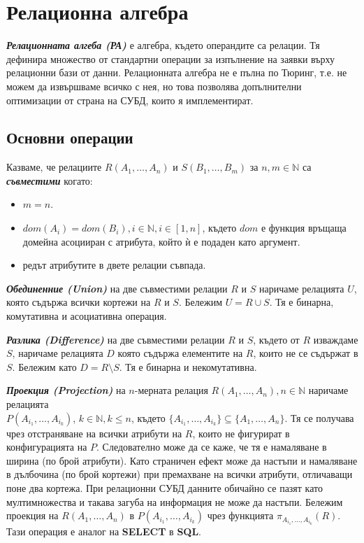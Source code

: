 \documentclass[fleqn,12pt]{article}
\begin{document}
\section{Релационна алгебра}

\textit{\textbf{Релационната алгеба (РА)}} е алгебра, където операндите са релации.
Тя дефинира множество от стандартни операции за изпълнение на заявки върху релационни бази от данни.
Релационната алгебра не е пълна по Тюринг, т.е. не можем да извършваме всичко с нея, но това позволява допълнителни оптимизации от страна на СУБД, които я имплементират.

\subsection{Основни операции}

Казваме, че релациите $R(A_1, \dots, A_n)$ и $S(B_1, \dots, B_m)$ за $n, m \in \mathbb{N}$ са \textbf{\textit{съвместими}} когато:
\begin{itemize}
    \item $m = n$.
    \item $dom(A_i) = dom(B_i), i \in \mathbb{N}, i \in [1, n]$, където $dom$ е функция връщаща домейна асоцииран с атрибута, който ѝ е подаден като аргумент.
    \item редът атрибутите в двете релации съвпада.
\end{itemize}
\bigbreak

\textbf{\textit{Обединенние (Union)}} на две съвместими релации $R$ и $S$ наричаме релацията $U$, която съдържа всички кортежи на $R$ и $S$.
Бележим $U = R \cup S$.
Тя е бинарна, комутативна и асоциативна операция.
\bigbreak

\textbf{\textit{Разлика (Difference)}} на две съвместими релации $R$ и $S$, където от $R$ изваждаме $S$, наричаме релацията $D$ която съдържа елементите на $R$, които не се съдържат в $S$.
Бележим като $D = R \setminus S$.
Тя е бинарна и некомутативна.
\bigbreak

\textbf{\textit{Проекция (Projection)}} на $n$-мерната релация $R(A_1, \dots, A_n), n \in \mathbb{N}$ наричаме релацията \\
$P(A_{i_1}, \dots, A_{i_k})$, $k \in \mathbb{N}, k \leq n$, където $\{A_{i_1}, \dots, A_{i_k}\} \subseteq \{A_1, \dots, A_n\}$.
Тя се получава чрез отстраняване на всички атрибути на $R$, които не фигурират в конфигурацията на $P$.
Следователно може да се каже, че тя е намаляване в ширина (по брой атрибути).
Като страничен ефект може да настъпи и намаляване в дълбочина (по брой кортежи) при премахване на всички атрибути, отличаващи поне два кортежа.
При релационни СУБД данните обичайно се пазят като мултимножества и такава загуба на информация не може да настъпи.
\bigbreak
Бележим проекция на $R(A_1, \dots, A_n)$ в $P(A_{i_1}, \dots, A_{i_k})$ чрез функцията $\pi_{A_{i_1}, \dots, A_{i_k}}(R)$.
Тази операция е аналог на \textbf{SELECT} в \textbf{SQL}.
\bigbreak
\end{document}
